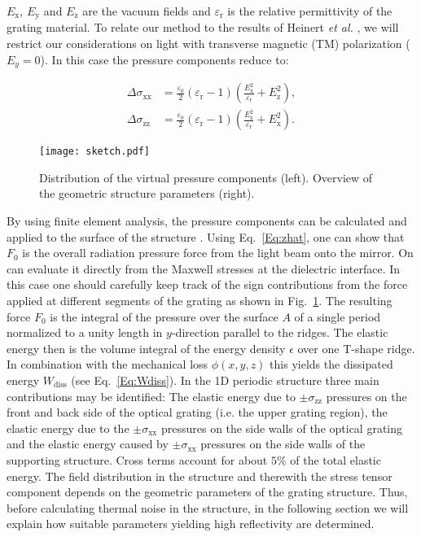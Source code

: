 \documentclass[twocolumn,secnumarabic,amssymb, nobibnotes, aps, prd, showpacs]{revtex4-1}
\begin{document}
\noindent $E_\mathrm{x}$, $E_\mathrm{y}$ and $E_\mathrm{z}$ are the vacuum fields and $\varepsilon_\mathrm{r}$ is the relative permittivity of the grating material. To relate our method to the results of Heinert \textit{et al.} \cite{Hei2013}, we will restrict our considerations on light with transverse magnetic (TM) polarization ($E_y=0$). In this case the pressure components reduce to:
	
\begin{align}
\Delta	\sigma_\mathrm{xx} &= \frac{\varepsilon_0}{2} (\varepsilon_\mathrm{r}-1) \left( \frac{E_\mathrm{x}^2}{\varepsilon_\mathrm{r}}+E_\mathrm{z}^2\right), \\
\Delta	\sigma_\mathrm{zz} &= \frac{\varepsilon_0}{2} (\varepsilon_\mathrm{r}-1) \left( \frac{E_\mathrm{z}^2}{\varepsilon_\mathrm{r}}+E_\mathrm{x}^2\right). 
	\end{align}
	
	\begin{figure}[tb]
	\centering
		\texttt{[image: sketch.pdf]}
	\caption{Distribution of the virtual pressure components (left). Overview of the geometric structure parameters (right).}
	\label{fig:sketch}
\end{figure}

\noindent By using finite element analysis, the pressure components can be calculated and applied to the surface of the structure \cite{comsol}. Using Eq.~\ref{Eq:zhat}, one can show that $F_0$ is the overall radiation pressure force from the light beam onto the mirror. On can evaluate it directly from the Maxwell stresses at the dielectric interface. In this case one should carefully keep track of the sign contributions from the force applied at different segments of the grating as shown in Fig.~\ref{fig:sketch}. The resulting force $F_0$ is the integral of the pressure over the surface $A$ of a single period normalized to a unity length in $y$-direction parallel to the ridges. The elastic energy then is the volume integral of the energy density $\epsilon$ over one T-shape ridge. In combination with the mechanical loss $\phi(x,y,z)$ this yields the dissipated energy $W_\mathrm{diss}$ (see Eq.~\ref{Eq:Wdiss}). In the 1D periodic structure three main contributions may be identified: The elastic energy due to $\pm \sigma_\mathrm{zz}$ pressures on the front and back side of the optical grating (i.e. the upper grating region), the elastic energy due to the $\pm \sigma_\mathrm{xx}$ pressures on the side walls of the optical grating and the elastic energy caused by $\pm \sigma_\mathrm{xx}$ pressures on the side walls of the supporting structure. Cross terms account for about $5\%$ of the total elastic energy. The field distribution in the structure and therewith the stress tensor component depends on the geometric parameters of the grating structure. Thus, before calculating thermal noise in the structure, in the following section we will explain how suitable parameters yielding high reflectivity are determined.   
\end{document}
